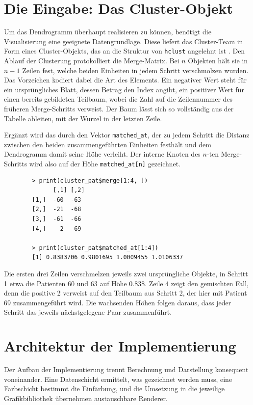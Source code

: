 \documentclass[11pt,a4paper]{article}
\newcommand{\code}[1]{\texttt{#1}}
\begin{document}
	\section{Die Eingabe: Das Cluster-Objekt}
	
	Um das Dendrogramm überhaupt realisieren zu können, benötigt die Visualisierung 
	eine geeignete Datengrundlage. Diese liefert das Cluster-Team in Form eines 
	Cluster-Objekts, das an die Struktur von \code{hclust} angelehnt ist \cite{r_core}. Den Ablauf der Clusterung protokolliert die Merge-Matrix. Bei $n$ Objekten hält sie in $n-1$ 
	Zeilen fest, welche beiden Einheiten in jedem Schritt verschmolzen wurden. Das 
	Vorzeichen kodiert dabei die Art des Elements. Ein negativer Wert steht für ein 
	ursprüngliches Blatt, dessen Betrag den Index angibt, ein positiver Wert für 
	einen bereits gebildeten Teilbaum, wobei die Zahl auf die Zeilennummer des 
	früheren Merge-Schritts verweist. Der Baum lässt sich so vollständig aus der 
	Tabelle ableiten, mit der Wurzel in der letzten Zeile.
	
	Ergänzt wird das durch den Vektor \code{matched\_at}, der zu jedem Schritt die 
	Distanz zwischen den beiden zusammengeführten Einheiten festhält und dem 
	Dendrogramm damit seine Höhe verleiht. Der interne Knoten des $n$-ten 
	Merge-Schritts wird also auf der Höhe \code{matched\_at[n]} gezeichnet.
	\clearpage
	\begin{lstlisting}
		> print(cluster_pat$merge[1:4, ])
		      [,1] [,2]
		[1,]  -60  -63
		[2,]  -21  -68
		[3,]  -61  -66
		[4,]    2  -69
		
		> print(cluster_pat$matched_at[1:4])
		[1] 0.8383706 0.9801695 1.0009455 1.0106337
	\end{lstlisting}
	
	Die ersten drei Zeilen verschmelzen jeweils zwei ursprüngliche Objekte, in 
	Schritt 1 etwa die Patienten 60 und 63 auf Höhe 0.838. Zeile 4 zeigt den 
	gemischten Fall, denn die positive 2 verweist auf den Teilbaum aus Schritt 2, 
	der hier mit Patient 69 zusammengeführt wird. Die wachsenden Höhen folgen daraus, 
	dass jeder Schritt das jeweils nächstgelegene Paar zusammenführt.
	
	\section{Architektur der Implementierung}
	
Der Aufbau der Implementierung trennt Berechnung und Darstellung konsequent 
voneinander. Eine Datenschicht ermittelt, was gezeichnet werden muss, eine 
Farbschicht bestimmt die Einfärbung, und die Umsetzung in die jeweilige 
Grafikbibliothek übernehmen austauschbare Renderer.
	
\end{document}
